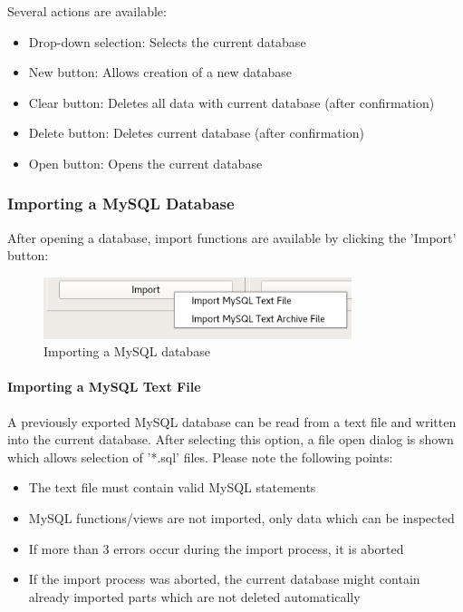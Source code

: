 \documentclass[10pt,letterpaper,extrafontsizes]{memoir}
\begin{document}
Several actions are available:

\begin{itemize}  
\item Drop-down selection: Selects the current database
\item New button: Allows creation of a new database
\item Clear button: Deletes all data with current database (after confirmation)
\item Delete button: Deletes current database (after confirmation)
\item Open button: Opens the current database
\end{itemize}

\subsubsection{Importing a MySQL Database}

After opening a database, import functions are available by clicking the 'Import' button:

\begin{figure}[H]
  \center
    \includegraphics[width=9cm,frame]{../screenshots/database_import.png}
  \caption{Importing a MySQL database}
\end{figure}

\paragraph{Importing a MySQL Text File}

A previously exported MySQL database can be read from a text file and written into the current database. After selecting this option, a file open dialog is shown which allows selection of '*.sql' files. Please note the following points:

\begin{itemize}  
\item The text file must contain valid MySQL statements
\item MySQL functions/views are not imported, only data which can be inspected
\item If more than 3 errors occur during the import process, it is aborted
\item If the import process was aborted, the current database might contain already imported parts which are not deleted automatically
\end{itemize}
\end{document}
